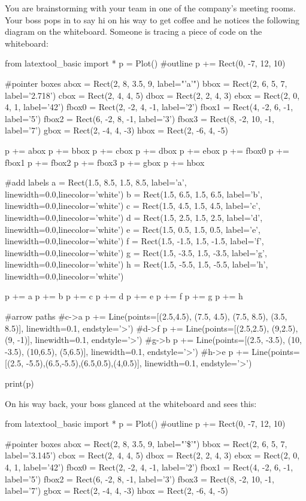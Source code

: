 \begin{ex}
You are brainstorming with your team in one of the company's meeting rooms. Your boss pops in to say hi on his way to get coffee and he notices the following diagram on the whiteboard. Someone is tracing a piece of code on the whiteboard:
\begin{python}
from latextool_basic import *
p = Plot()
#outline
p += Rect(0, -7, 12, 10)

#pointer boxes
abox = Rect(2, 8, 3.5, 9, label="'a'")
bbox = Rect(2, 6, 5, 7, label='2.718')
cbox = Rect(2, 4, 4, 5)
dbox = Rect(2, 2, 4, 3)
ebox = Rect(2, 0, 4, 1, label='42')
fbox0 = Rect(2, -2, 4, -1, label='2')
fbox1 = Rect(4, -2, 6, -1, label='5')
fbox2 = Rect(6, -2, 8, -1, label='3')
fbox3 = Rect(8, -2, 10, -1, label='7')
gbox = Rect(2, -4, 4, -3)
hbox = Rect(2, -6, 4, -5)

p += abox
p += bbox
p += cbox
p += dbox
p += ebox
p += fbox0
p += fbox1
p += fbox2
p += fbox3
p += gbox
p += hbox

#add labels
a = Rect(1.5, 8.5, 1.5, 8.5, label='a', linewidth=0.0,linecolor='white')
b = Rect(1.5, 6.5, 1.5, 6.5, label='b', linewidth=0.0,linecolor='white')
c = Rect(1.5, 4.5, 1.5, 4.5, label='c', linewidth=0.0,linecolor='white')
d = Rect(1.5, 2.5, 1.5, 2.5, label='d', linewidth=0.0,linecolor='white')
e = Rect(1.5, 0.5, 1.5, 0.5, label='e', linewidth=0.0,linecolor='white')
f = Rect(1.5, -1.5, 1.5, -1.5, label='f', linewidth=0.0,linecolor='white')
g = Rect(1.5, -3.5, 1.5, -3.5, label='g', linewidth=0.0,linecolor='white')
h = Rect(1.5, -5.5, 1.5, -5.5, label='h', linewidth=0.0,linecolor='white')

p += a
p += b
p += c
p += d
p += e
p += f
p += g
p += h

#arrow paths
#c->a
p += Line(points=[(2.5,4.5), (7.5, 4.5), (7.5, 8.5), (3.5, 8.5)], linewidth=0.1, endstyle='>')
#d->f
p += Line(points=[(2.5,2.5), (9,2.5), (9, -1)], linewidth=0.1, endstyle='>')
#g->b
p += Line(points=[(2.5, -3.5), (10, -3.5), (10,6.5), (5,6.5)], linewidth=0.1, endstyle='>')
#h->e
p += Line(points=[(2.5, -5.5),(6.5,-5.5),(6.5,0.5),(4,0.5)], linewidth=0.1, endstyle='>')

print(p)
\end{python}

On his way back, your boss glanced at the whiteboard and sees this:
\begin{python}
from latextool_basic import *
p = Plot()
#outline
p += Rect(0, -7, 12, 10)

#pointer boxes
abox = Rect(2, 8, 3.5, 9, label="'\$'")
bbox = Rect(2, 6, 5, 7, label='3.145')
cbox = Rect(2, 4, 4, 5)
dbox = Rect(2, 2, 4, 3)
ebox = Rect(2, 0, 4, 1, label='42')
fbox0 = Rect(2, -2, 4, -1, label='2')
fbox1 = Rect(4, -2, 6, -1, label='5')
fbox2 = Rect(6, -2, 8, -1, label='3')
fbox3 = Rect(8, -2, 10, -1, label='7')
gbox = Rect(2, -4, 4, -3)
hbox = Rect(2, -6, 4, -5)


\end{python}
\end{ex}
